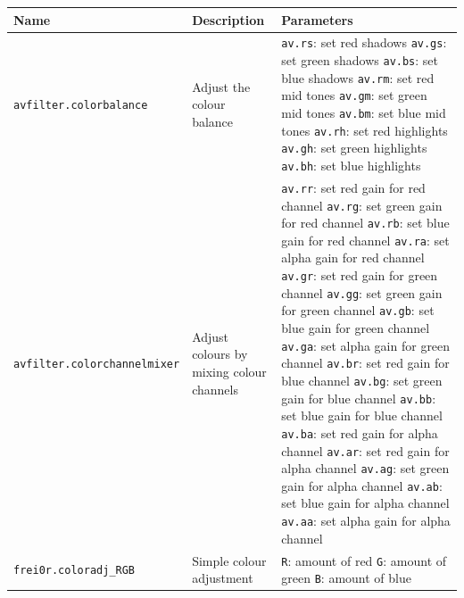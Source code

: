 \documentclass[../MasterThesis.tex]{subfiles}
\begin{document}
\begin{table}[H]
	\footnotesize
	\begin{tabular}{lp{4.4cm}p{4.5cm}}
		\toprule
		Name & Description & Parameters \\
		\midrule
		\texttt{avfilter.colorbalance} & Adjust the colour balance & 
		\tiny{
		\texttt{av.rs}: set red shadows \newline 
		\texttt{av.gs}: set green shadows \newline 
		\texttt{av.bs}: set blue shadows \newline 
		\texttt{av.rm}: set red mid tones \newline 
		\texttt{av.gm}: set green mid tones \newline 
		\texttt{av.bm}: set blue mid tones \newline 
		\texttt{av.rh}: set red highlights \newline 
		\texttt{av.gh}: set green highlights \newline 
		\texttt{av.bh}: set blue highlights}
		\\
		\texttt{avfilter.colorchannelmixer} & Adjust colours by mixing colour channels & 
		\tiny{
		\texttt{av.rr}: set red gain for red channel \newline 
		\texttt{av.rg}: set green gain for red channel \newline 
		\texttt{av.rb}: set blue gain for red channel \newline 
		\texttt{av.ra}: set alpha gain for red channel \newline 
		\texttt{av.gr}: set red gain for green channel \newline 
		\texttt{av.gg}: set green gain for green channel \newline 
		\texttt{av.gb}: set blue gain for green channel \newline 
		\texttt{av.ga}: set alpha gain for green channel \newline 
		\texttt{av.br}: set red gain for blue channel \newline 
		\texttt{av.bg}: set green gain for blue channel \newline 
		\texttt{av.bb}: set blue gain for blue channel \newline 
		\texttt{av.ba}: set red gain for alpha channel \newline 
		\texttt{av.ar}: set red gain for alpha channel \newline 
		\texttt{av.ag}: set green gain for alpha channel \newline 
		\texttt{av.ab}: set blue gain for alpha channel \newline 
		\texttt{av.aa}: set alpha gain for alpha channel}
		\\
		\texttt{frei0r.coloradj\_RGB} & Simple colour adjustment & 
		\tiny{
		\texttt{R}: amount of red \newline 
		\texttt{G}: amount of green \newline 
		\texttt{B}: amount of blue}
		\\
		\bottomrule
	\end{tabular}
\end{table}
\end{document}
